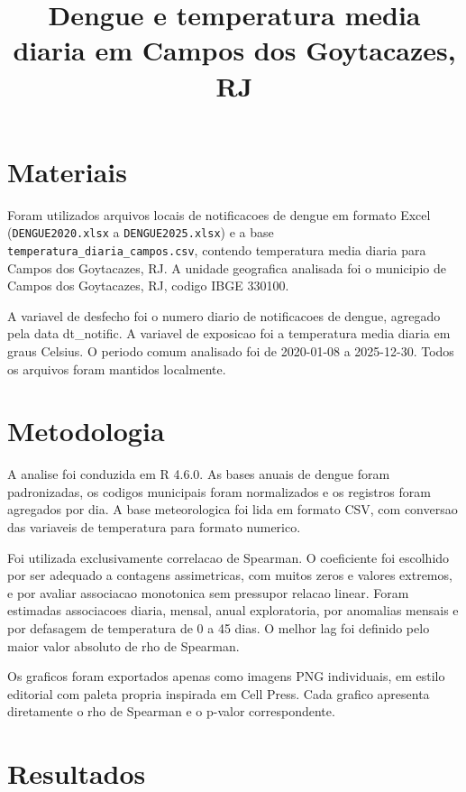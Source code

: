 \documentclass[
  12pt,
]{article}
\title{Dengue e temperatura media diaria em Campos dos Goytacazes, RJ}
\author{}
\date{\vspace{-2.5em}}
\begin{document}
\maketitle

\section{Materiais}\label{materiais}

Foram utilizados arquivos locais de notificacoes de dengue em formato
Excel (\texttt{DENGUE2020.xlsx} a \texttt{DENGUE2025.xlsx}) e a base
\texttt{temperatura\_diaria\_campos.csv}, contendo temperatura media
diaria para Campos dos Goytacazes, RJ. A unidade geografica analisada
foi o municipio de Campos dos Goytacazes, RJ, codigo IBGE 330100.

A variavel de desfecho foi o numero diario de notificacoes de dengue,
agregado pela data dt\_notific. A variavel de exposicao foi a
temperatura media diaria em graus Celsius. O periodo comum analisado foi
de 2020-01-08 a 2025-12-30. Todos os arquivos foram mantidos localmente.

\section{Metodologia}\label{metodologia}

A analise foi conduzida em R 4.6.0. As bases anuais de dengue foram
padronizadas, os codigos municipais foram normalizados e os registros
foram agregados por dia. A base meteorologica foi lida em formato CSV,
com conversao das variaveis de temperatura para formato numerico.

Foi utilizada exclusivamente correlacao de Spearman. O coeficiente foi
escolhido por ser adequado a contagens assimetricas, com muitos zeros e
valores extremos, e por avaliar associacao monotonica sem pressupor
relacao linear. Foram estimadas associacoes diaria, mensal, anual
exploratoria, por anomalias mensais e por defasagem de temperatura de 0
a 45 dias. O melhor lag foi definido pelo maior valor absoluto de rho de
Spearman.

Os graficos foram exportados apenas como imagens PNG individuais, em
estilo editorial com paleta propria inspirada em Cell Press. Cada
grafico apresenta diretamente o rho de Spearman e o p-valor
correspondente.

\section{Resultados}\label{resultados}
\end{document}
